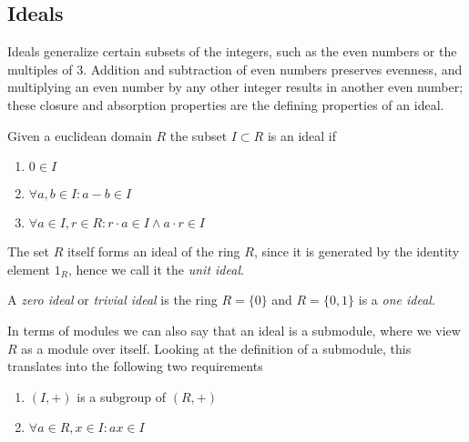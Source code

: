 \subsection{Ideals}
Ideals generalize certain subsets of the integers, such as the even numbers or the multiples of 3.
Addition and subtraction of even numbers preserves evenness, and multiplying an even number by any other integer results in another even number; these closure and absorption properties are the defining properties of an ideal.

\begin{definition}[Ideal]
   Given a euclidean domain \(R\) the subset \(I \subset R\) is an ideal if
   \begin{enumerate}[label=\roman*, align=Center]
      \item \(0 \in I\)
      \item \(\forall a, b \in I: a - b \in I\)
      \item \(\forall a \in I, r \in R: r \cdot a \in I \land a \cdot r \in I\)
   \end{enumerate}
\end{definition}
\begin{remark}
   The set \(R\) itself forms an ideal of the ring \(R\), since it is generated by the identity element \(1_R\), hence we call it the \emph{unit ideal}.
\end{remark}
\begin{remark}
   A \emph{zero ideal} or \emph{trivial ideal} is the ring \(R = \{0\}\) and \(R = \{0, 1\}\) is a \emph{one ideal}.
\end{remark}
\begin{remark}
   In terms of modules we can also say that an ideal is a submodule, where we view \(R\) as a module over itself.
   Looking at the definition of a submodule, this translates into the following two requirements
   \begin{enumerate}[label=\roman*, align=Center]
      \item \((I, +)\) is a subgroup of \((R, +)\)
      \item \(\forall a \in R, x \in I: ax \in I\)
   \end{enumerate}
\end{remark}

